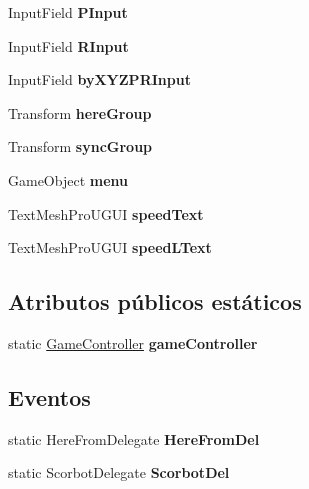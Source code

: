 \begin{DoxyCompactItemize}
Input\+Field {\bfseries P\+Input}
\item 
\mbox{\label{class_game_controller_a909684cd4f88d27998aab5517d01fb41}} 
Input\+Field {\bfseries R\+Input}
\item 
\mbox{\label{class_game_controller_a0e29079c699df359be73fc23f7c1dbc6}} 
Input\+Field {\bfseries by\+X\+Y\+Z\+P\+R\+Input}
\item 
\mbox{\label{class_game_controller_adc5d9c82337016042d0a4b7a431b8a0e}} 
Transform {\bfseries here\+Group}
\item 
\mbox{\label{class_game_controller_aef6447cf8e9a9e5945a45e0a0d4cbeea}} 
Transform {\bfseries sync\+Group}
\item 
\mbox{\label{class_game_controller_af4c293b5d621fe28f1e6b72f9efa293f}} 
Game\+Object {\bfseries menu}
\item 
\mbox{\label{class_game_controller_ae2a547ae9f7294b4c3d7064ff037b7d1}} 
Text\+Mesh\+Pro\+U\+G\+UI {\bfseries speed\+Text}
\item 
\mbox{\label{class_game_controller_a80a5ddb548350ff8522690213155ffc7}} 
Text\+Mesh\+Pro\+U\+G\+UI {\bfseries speed\+L\+Text}
\end{DoxyCompactItemize}
\subsection*{Atributos públicos estáticos}
\begin{DoxyCompactItemize}
\item 
\mbox{\label{class_game_controller_a46ccbbf4e13ee78f28da6b0ed2595cf3}} 
static \mbox{\hyperlink{class_game_controller}{Game\+Controller}} {\bfseries game\+Controller}
\end{DoxyCompactItemize}
\subsection*{Eventos}
\begin{DoxyCompactItemize}
\item 
\mbox{\label{class_game_controller_acb69ab50fb463c78d7d47e94edf85a9e}} 
static Here\+From\+Delegate {\bfseries Here\+From\+Del}
\item 
\mbox{\label{class_game_controller_a801ce04758bfd9d108cc1e0161bb50d8}} 
static Scorbot\+Delegate {\bfseries Scorbot\+Del}
\end{DoxyCompactItemize}
